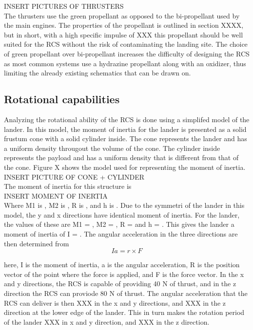 					INSERT PICTURES OF THRUSTERS\\


The thrusters use the green propellant as opposed to the bi-propellant used by the main engines. The properties of the propellant is outlined in section XXXX, but in short, with a high specific impulse of XXX this propellant should be well suited for the RCS without the risk of contaminating the landing site. The choice of green propellant over bi-propellant increases the difficulty of designing the RCS as most common systems use a hydrazine propellant along with an oxidizer, thus limiting the already existing schematics that can be drawn on.\\

\subsection{Rotational capabilities}

Analyzing the rotational ability of the RCS is done using a simplifed model of the lander. In this model, the moment of inertia for the lander is presented as a solid frustum cone with a solid cylinder inside. The cone represents the lander and has a uniform density througout the volume of the cone. The cylinder inside represents the payload and has a uniform density that is different from that of the cone. Figure X shows the model used for representing the moment of inertia.\\

					INSERT PICTURE OF CONE + CYLINDER\\


The moment of inertia for this structure is\\

					INSERT MOMENT OF INERTIA\\

Where M1 is , M2 is , R is , and h is . Due to the symmetri of the lander in this model, the y and x directions have identical moment of inertia. For the lander, the values of these are M1 = , M2 = , R = and h = . This gives the lander a moment of inertia of I = . The angular acceleration in the three directions are then determined from\\ 
\begin{equation}
    I a = r \times F
\end{equation}
    
here, I is the moment of inertia, a is the angular acceleration, R is the position vector of the point where the force is applied, and F is the force vector. In the x and y directions, the RCS is capable of providing 40 N of thrust, and in the z direction the RCS can proviode 80 N of thrust. The angular acceleration that the RCS can deliver is then XXX in the x and y directions, and XXX in the z direction at the lower edge of the lander. This in turn makes the rotation period of the lander XXX in x and y direction, and XXX in the z direction.\\

